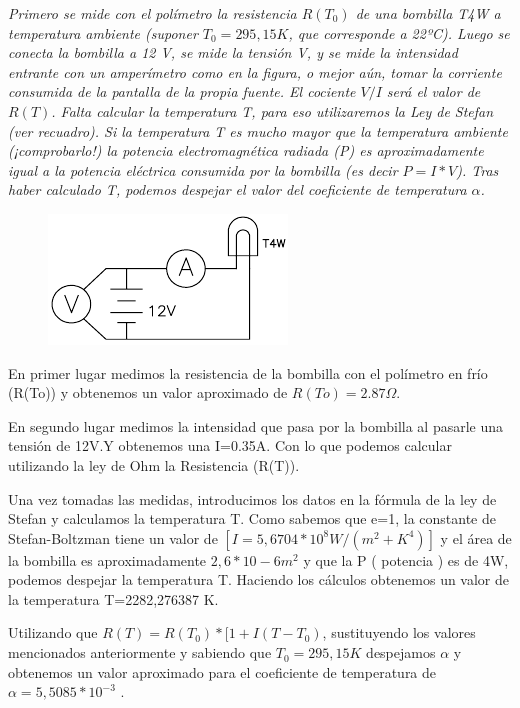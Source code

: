 \documentclass[paper=a4, fontsize=11pt]{scrartcl} %
\numberwithin{equation}{section} %
\numberwithin{figure}{section} %
\numberwithin{table}{section} %
\begin{document}
\textit{Primero se mide con el polímetro la resistencia $ R(T_{0}) $ de una bombilla T4W a temperatura ambiente (suponer $ T_{0}=295,15 K $, que corresponde a 22ºC). Luego se conecta la bombilla a 12 V, se mide la tensión V, y se mide la intensidad entrante con un amperímetro como en la figura, o mejor aún, tomar la corriente consumida de la pantalla de la propia fuente. El cociente $ V/I $ será el valor de $ R(T) $. Falta calcular la temperatura T, para eso utilizaremos la Ley de Stefan (ver recuadro). Si la temperatura T es mucho mayor que la temperatura ambiente (¡comprobarlo!) la potencia electromagnética radiada (P) es aproximadamente igual a la potencia eléctrica consumida por la bombilla (es decir $ P=I*V $). Tras haber calculado T, podemos despejar el valor del coeficiente de temperatura $ \alpha $.} \newline

\begin{figure}[h]
	\centering
	\includegraphics[scale=1]{image/bombilla}
\end{figure}

En primer lugar medimos la resistencia de la bombilla con el polímetro en frío (R(To)) y obtenemos un valor aproximado de $ R(To)=2.87 \Omega $.\newline

En segundo lugar medimos la intensidad que pasa por la bombilla al pasarle una tensión de 12V.Y obtenemos una I=0.35A. Con lo que podemos calcular utilizando la ley de Ohm la Resistencia (R(T)).\newline

Una vez tomadas las medidas, introducimos los datos en la fórmula de la ley de Stefan y calculamos la temperatura T. Como sabemos que e=1, la constante de Stefan-Boltzman tiene un valor de  $ [I=5,6704*10^{8} W/(m^{2}+K^{4})] $ y el área de la bombilla es aproximadamente $ 2,6*10-6m^{2} $ y que la P ( potencia ) es de 4W, podemos despejar la temperatura T. Haciendo los cálculos obtenemos un valor de la temperatura T=2282,276387 K.\newline

Utilizando que $ R(T)=R(T_{0})*[1+I(T - T_{0}) $, sustituyendo los valores mencionados anteriormente y sabiendo que $ T_{0}=295,15K $ despejamos $ \alpha $ y obtenemos un valor aproximado para el coeficiente de temperatura de $ \alpha =5,5085*10^{-3} $ .\newline
\end{document}
